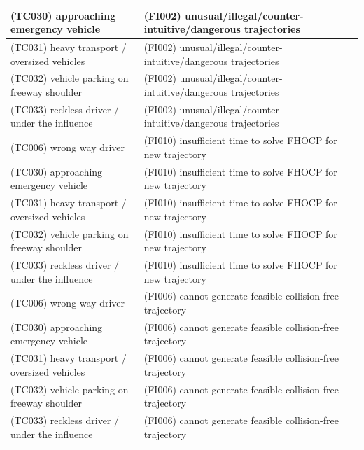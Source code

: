\documentclass{article}
\begin{document}
\begin{longtable}{|p{8cm}|p{8cm}|}
\cellcolor{cGreen}(TC030) approaching emergency vehicle& \cellcolor{cBlue}(FI002) unusual/illegal/counter-intuitive/dangerous trajectories\\\hline
\cellcolor{cGreen}(TC031) heavy transport / oversized vehicles& \cellcolor{cBlue}(FI002) unusual/illegal/counter-intuitive/dangerous trajectories\\\hline
\cellcolor{cGreen}(TC032) vehicle parking on freeway shoulder& \cellcolor{cBlue}(FI002) unusual/illegal/counter-intuitive/dangerous trajectories\\\hline
\cellcolor{cGreen}(TC033) reckless driver / under the influence& \cellcolor{cBlue}(FI002) unusual/illegal/counter-intuitive/dangerous trajectories\\\hline
\cellcolor{cGreen}(TC006) wrong way driver& \cellcolor{cBlue}(FI010) insufficient time to solve FHOCP for new trajectory\\\hline
\cellcolor{cGreen}(TC030) approaching emergency vehicle& \cellcolor{cBlue}(FI010) insufficient time to solve FHOCP for new trajectory\\\hline
\cellcolor{cGreen}(TC031) heavy transport / oversized vehicles& \cellcolor{cBlue}(FI010) insufficient time to solve FHOCP for new trajectory\\\hline
\cellcolor{cGreen}(TC032) vehicle parking on freeway shoulder& \cellcolor{cBlue}(FI010) insufficient time to solve FHOCP for new trajectory\\\hline
\cellcolor{cGreen}(TC033) reckless driver / under the influence& \cellcolor{cBlue}(FI010) insufficient time to solve FHOCP for new trajectory\\\hline
\cellcolor{cGreen}(TC006) wrong way driver& \cellcolor{cBlue}(FI006) cannot generate feasible collision-free trajectory\\\hline
\cellcolor{cGreen}(TC030) approaching emergency vehicle& \cellcolor{cBlue}(FI006) cannot generate feasible collision-free trajectory\\\hline
\cellcolor{cGreen}(TC031) heavy transport / oversized vehicles& \cellcolor{cBlue}(FI006) cannot generate feasible collision-free trajectory\\\hline
\cellcolor{cGreen}(TC032) vehicle parking on freeway shoulder& \cellcolor{cBlue}(FI006) cannot generate feasible collision-free trajectory\\\hline
\cellcolor{cGreen}(TC033) reckless driver / under the influence& \cellcolor{cBlue}(FI006) cannot generate feasible collision-free trajectory\\\hline

\end{longtable}
\end{document}

